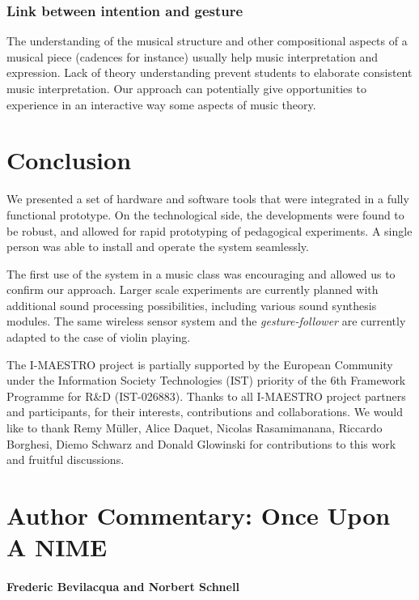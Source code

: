 \subsubsection{Link between intention and gesture}
The understanding of the musical structure and other compositional aspects of a musical piece (cadences for instance) usually help music interpretation and expression. Lack of theory understanding prevent students to elaborate consistent music interpretation. Our approach can potentially give opportunities to experience in an interactive way some aspects of music theory. 

\section{Conclusion}
We presented a set of hardware and software tools that were integrated in a fully functional prototype. On the technological side, the developments were found to be robust, and allowed for rapid prototyping of pedagogical experiments. A single person was able to install and operate the system seamlessly.

The first use of the system in a music class was encouraging and allowed us to confirm our approach. Larger scale experiments are currently planned with additional sound processing possibilities, including various sound synthesis modules. The same wireless sensor system and the \emph{gesture-follower} are currently adapted to the case of violin playing.


%
\begin{acknowledgement}
The I-MAESTRO project is partially supported by the European Community under the Information Society Technologies (IST) priority of the 6th Framework Programme for R\&D (IST-026883). Thanks to all I-MAESTRO project partners and participants, for their interests, contributions and collaborations.
We would like to thank Remy M\"uller, Alice Daquet, Nicolas Rasamimanana, Riccardo Borghesi, Diemo Schwarz and Donald Glowinski for contributions to this work and fruitful discussions.
\end{acknowledgement}
%

\section*{Author Commentary: Once Upon A NIME}

\paragraph{Frederic Bevilacqua and Norbert Schnell}


